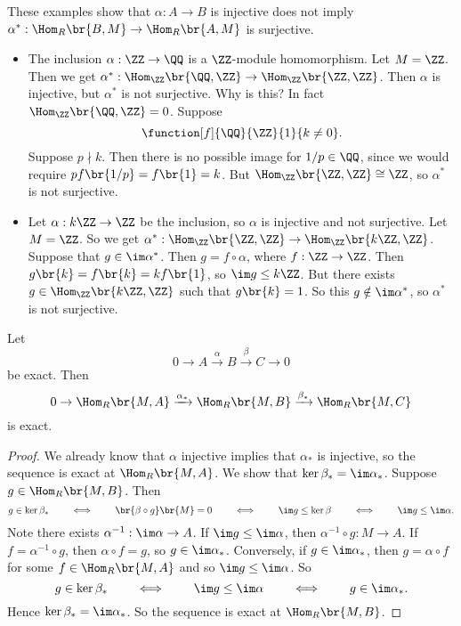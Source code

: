 \begin{example*}
These examples show that $ \alpha : A \to B $ is injective does not imply $ \alpha^* : \Hom_R\br{B, M} \to \Hom_R\br{A, M} $ is surjective.
\begin{itemize}
\item The inclusion $ \alpha : \ZZ \to \QQ $ is a $ \ZZ $-module homomorphism. Let $ M = \ZZ $. Then we get $ \alpha^* : \Hom_\ZZ\br{\QQ, \ZZ} \to \Hom_\ZZ\br{\ZZ, \ZZ} $. Then $ \alpha $ is injective, but $ \alpha^* $ is not surjective. Why is this? In fact $ \Hom_\ZZ\br{\QQ, \ZZ} = 0 $. Suppose
$$ \function[f]{\QQ}{\ZZ}{1}{k \ne 0}. $$
Suppose $ p \nmid k $. Then there is no possible image for $ 1 / p \in \QQ $, since we would require $ pf\br{1 / p} = f\br{1} = k $. But $ \Hom_\ZZ\br{\ZZ, \ZZ} \cong \ZZ $, so $ \alpha^* $ is not surjective.
\item Let $ \alpha : k\ZZ \to \ZZ $ be the inclusion, so $ \alpha $ is injective and not surjective. Let $ M = \ZZ $. So we get $ \alpha^* : \Hom_\ZZ\br{\ZZ, \ZZ} \to \Hom_\ZZ\br{k\ZZ, \ZZ} $. Suppose that $ g \in \im \alpha^* $. Then $ g = f \circ \alpha $, where $ f : \ZZ \to \ZZ $. Then $ g\br{k} = f\br{k} = kf\br{1} $, so $ \im g \le k\ZZ $. But there exists $ g \in \Hom_\ZZ\br{k\ZZ, \ZZ} $ such that $ g\br{k} = 1 $. So this $ g \notin \im \alpha^* $, so $ \alpha^* $ is not surjective.
\end{itemize}
\end{example*}

\begin{proposition}
Let
$$ 0 \to A \xrightarrow{\alpha} B \xrightarrow{\beta} C \to 0 $$
be exact. Then
$$ 0 \to \Hom_R\br{M, A} \xrightarrow{\alpha_*} \Hom_R\br{M, B} \xrightarrow{\beta_*} \Hom_R\br{M, C} $$
is exact.
\end{proposition}

\begin{proof}
We already know that $ \alpha $ injective implies that $ \alpha_* $ is injective, so the sequence is exact at $ \Hom_R\br{M, A} $. We show that $ \ker \beta_* = \im \alpha_* $. Suppose $ g \in \Hom_R\br{M, B} $. Then
$$ g \in \ker \beta_* \qquad \iff \qquad \br{\beta \circ g}\br{M} = 0 \qquad \iff \qquad \im g \le \ker \beta \qquad \iff \qquad \im g \le \im \alpha. $$
Note there exists $ \alpha^{-1} : \im \alpha \to A $. If $ \im g \le \im \alpha $, then $ \alpha^{-1} \circ g : M \to A $. If $ f = \alpha^{-1} \circ g $, then $ \alpha \circ f = g $, so $ g \in \im \alpha_* $. Conversely, if $ g \in \im \alpha_* $, then $ g = \alpha \circ f $ for some $ f \in \Hom_R\br{M, A} $ and so $ \im g \le \im \alpha $. So
$$ g \in \ker \beta_* \qquad \iff \qquad \im g \le \im \alpha \qquad \iff \qquad g \in \im \alpha_*. $$
Hence $ \ker \beta_* = \im \alpha_* $. So the sequence is exact at $ \Hom_R\br{M, B} $.
\end{proof}

